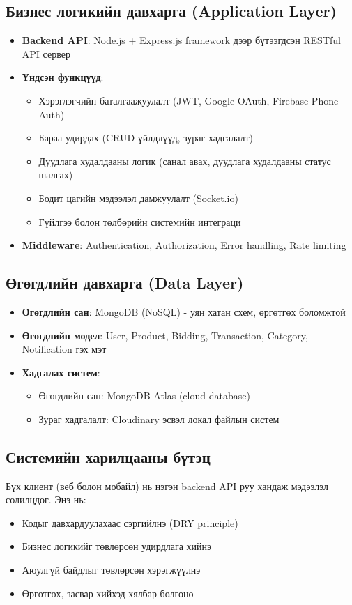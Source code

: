 \subsection{Бизнес логикийн давхарга (Application Layer)}
\begin{itemize}
    \item \textbf{Backend API}: Node.js + Express.js framework дээр бүтээгдсэн RESTful API сервер
    \item \textbf{Үндсэн функцүүд}:
    \begin{itemize}
        \item Хэрэглэгчийн баталгаажуулалт (JWT, Google OAuth, Firebase Phone Auth)
        \item Бараа удирдах (CRUD үйлдлүүд, зураг хадгалалт)
        \item Дуудлага худалдааны логик (санал авах, дуудлага худалдааны статус шалгах)
        \item Бодит цагийн мэдээлэл дамжуулалт (Socket.io)
        \item Гүйлгээ болон төлбөрийн системийн интеграци
    \end{itemize}
    \item \textbf{Middleware}: Authentication, Authorization, Error handling, Rate limiting
\end{itemize}

\subsection{Өгөгдлийн давхарга (Data Layer)}
\begin{itemize}
    \item \textbf{Өгөгдлийн сан}: MongoDB (NoSQL) - уян хатан схем, өргөтгөх боломжтой
    \item \textbf{Өгөгдлийн модел}: User, Product, Bidding, Transaction, Category, Notification гэх мэт
    \item \textbf{Хадгалах систем}:
    \begin{itemize}
        \item Өгөгдлийн сан: MongoDB Atlas (cloud database)
        \item Зураг хадгалалт: Cloudinary эсвэл локал файлын систем
    \end{itemize}
\end{itemize}

\subsection{Системийн харилцааны бүтэц}
Бүх клиент (веб болон мобайл) нь нэгэн backend API руу хандаж мэдээлэл солилцдог. Энэ нь:
\begin{itemize}
    \item Кодыг давхардуулахаас сэргийлнэ (DRY principle)
    \item Бизнес логикийг төвлөрсөн удирдлага хийнэ
    \item Аюулгүй байдлыг төвлөрсөн хэрэгжүүлнэ
    \item Өргөтгөх, засвар хийхэд хялбар болгоно
\end{itemize}

